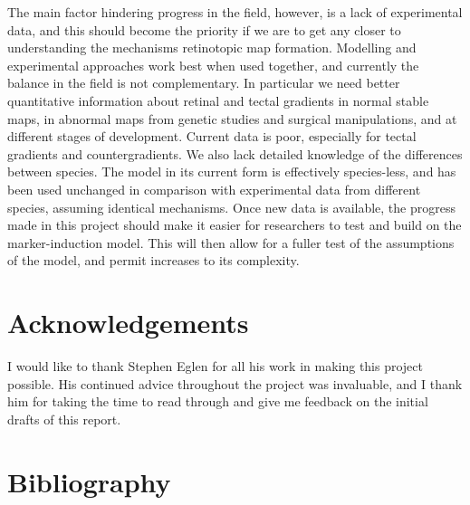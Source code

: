 \documentclass[11pt]{"article"}
\begin{document}
The main factor hindering progress in the field, however, is a lack of experimental data, and this should become the priority if we are to get any closer to understanding the mechanisms retinotopic map formation. Modelling and experimental approaches work best when used together, and currently the balance in the field is not complementary. In particular we need better quantitative information about retinal and tectal gradients in normal stable maps, in abnormal maps from genetic studies and surgical manipulations, and at different stages of development. Current data is poor, especially for tectal gradients and countergradients. We also lack detailed knowledge of the differences between species. The model in its current form is effectively species-less, and has been used unchanged in comparison with experimental data from different species, assuming identical mechanisms. Once new data is available, the progress made in this project should make it easier for researchers to test and build on the marker-induction model. This will then allow for a fuller test of the assumptions of the model, and permit increases to its complexity.


\section{Acknowledgements}

I would like to thank Stephen Eglen for all his work in making this project possible. His continued advice throughout the project was invaluable, and I thank him for taking the time to read through and give me feedback on the initial drafts of this report.


\section{Bibliography}
\end{document}
